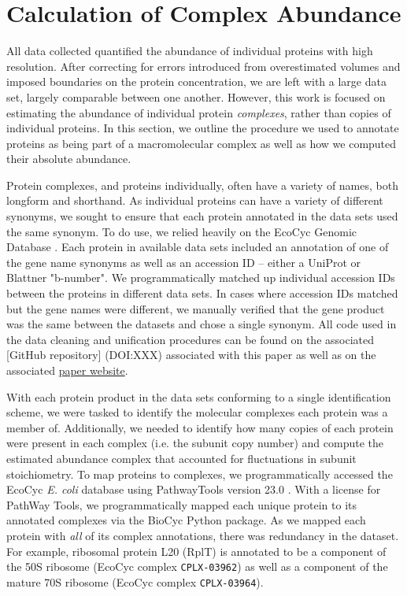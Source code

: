 \section{Calculation of Complex Abundance}

All data collected quantified the abundance of individual proteins with high
resolution. After correcting for errors introduced from overestimated volumes
and imposed boundaries on the protein concentration, we are left with a large
data set, largely comparable between one another. However, this work is focused
on estimating the abundance of individual protein \textit{complexes}, rather
than copies of individual proteins. In this section, we outline the procedure we
used to annotate proteins as being part of a macromolecular complex as well as
how we computed their absolute abundance.


Protein complexes, and proteins individually, often have a variety of names,
both longform and shorthand. As individual proteins can have a variety of
different synonyms, we sought to ensure that each protein annotated in the
data sets used the same synonym. To do use, we relied heavily on the EcoCyc
Genomic Database \citep{keseler2017}.  Each protein in available data sets
included an annotation of one of the gene name synonyms as well as an
accession ID -- either a UniProt or Blattner "b-number". We programmatically
matched up individual accession IDs between the proteins in different data sets.
In cases where accession IDs matched but the gene names were different, we
manually verified that the gene product was the same between the datasets and
chose a single synonym.  All code used  in the data cleaning and unification
procedures can be found on the associated
\href{https://github.com/rpgroup-pboc/growth_limits}[GitHub repository]
(DOI:XXX) associated with this paper as well as on the associated
\href{https://rpgroup.caltech.edu/growth_limits}{paper website}.

With each protein product in the data sets conforming to a single identification
scheme, we were tasked to identify the molecular complexes each protein was a
member of. Additionally, we needed to identify how many copies of each protein
were present in each complex (i.e. the subunit copy number) and compute the
estimated abundance complex that accounted for fluctuations in subunit
stoichiometry. To map proteins to complexes, we programmatically accessed the
EcoCyc \textit{E. coli} database \cite{keseler2017} using PathwayTools version
23.0 \cite{karp2019}. With a license for PathWay Tools, we programmatically
mapped each unique protein to its annotated complexes via the
BioCyc Python package. As we mapped each protein with \textit{all} of its
complex annotations, there was redundancy in the dataset. For example, ribosomal
protein L20 (RplT) is annotated to be a component of the 50S ribosome (EcoCyc
complex \texttt{CPLX-03962}) as well as a component of the mature 70S ribosome
(EcoCyc complex \texttt{CPLX-03964}).


